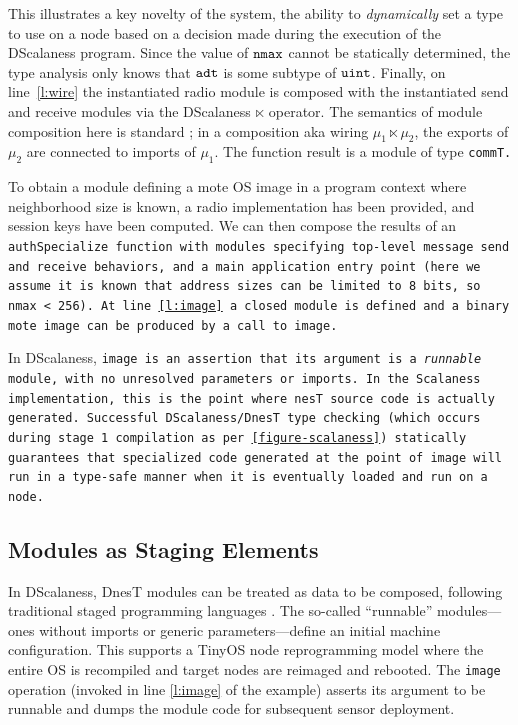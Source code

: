 This illustrates a key novelty of the system, the ability to \emph{dynamically} set a type to
use on a node based on a decision made during the execution of the DScalaness program. Since the
value of $\tt{nmax}$ cannot be statically determined, the type analysis only knows that
$\tt{adt}$ is some subtype of $\tt{uint}$. Finally, on line~\ref{l:wire} the instantiated radio
module is composed with the instantiated send and receive modules via the DScalaness $\ltimes$
operator. The semantics of module composition here is standard \cite{Cardelli-1997}; in a
composition aka wiring $\mu_1 \ltimes \mu_2$, the exports of $\mu_2$ are connected to imports of
$\mu_1$. The function result is a module of type \tt{commT}.

To obtain a module defining a mote OS image in a program context where neighborhood size is
known, a radio implementation has been provided, and session keys have been computed. We can
then compose the results of an \tt{authSpecialize} function with modules specifying top-level
message send and receive behaviors, and a \texttt{main} application entry point (here we assume
it is known that address sizes can be limited to 8 bits, so \tt{nmax} < 256). At line
\ref{l:image} a closed module is defined and a binary mote image can be produced by a call to
\tt{image}.

In DScalaness, \tt{image} is an assertion that its argument is a \emph{runnable} module, with no
unresolved parameters or imports. In the Scalaness implementation, this is the point where nesT
source code is actually generated. Successful DScalaness/DnesT type checking (which occurs
during stage 1 compilation as per \autoref{figure-scalaness}) statically guarantees that
specialized code generated at the point of \tt{image} will run in a type-safe manner when it is
eventually loaded and run on a node.

\subsection{Modules as Staging Elements}

In DScalaness, DnesT modules can be treated as data to be composed, following traditional staged
programming languages \cite{Taha-MetaML}. The so-called ``runnable'' modules---ones without
imports or generic parameters---define an initial machine configuration. This supports a TinyOS
node reprogramming model where the entire OS is recompiled and target nodes are reimaged and
rebooted. The \texttt{image} operation (invoked in line \ref{l:image} of the example) asserts
its argument to be runnable and dumps the module code for subsequent sensor deployment.

